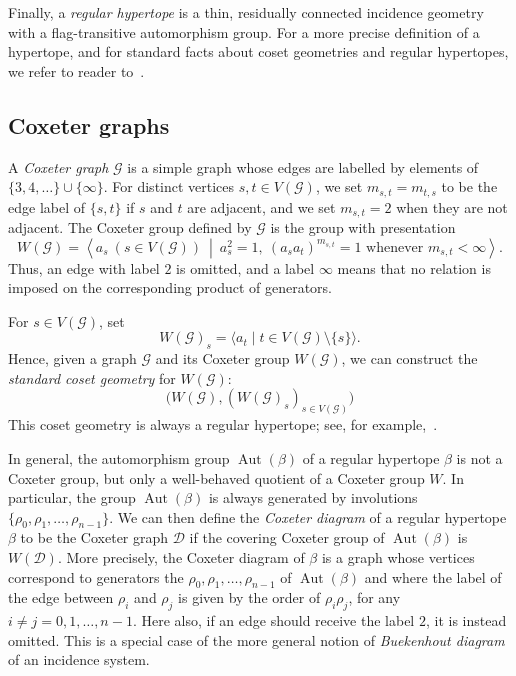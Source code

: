 \documentclass[11pt,letterpaper]{amsart}
\DeclareMathOperator{\Aut}{Aut}
\newcommand{\GG}{\mathcal{G}}
\begin{document}
Finally, a \emph{regular hypertope} is a thin, residually connected incidence geometry with a flag-transitive automorphism group. For a more precise definition of a hypertope, and for standard facts about coset geometries and regular hypertopes, we refer to reader to~\cite{buekenhout2013diagram,PiedadeTranchida_FromGroupOps2026,hypertopes}.

\subsection{Coxeter graphs}\label{sec:prelims:Coxeter}

A \emph{Coxeter graph} $\GG$ is a simple graph whose edges are labelled by elements of $\{3,4,\ldots\}\cup\{\infty\}$. For distinct vertices $s,t\in V(\GG)$, we set $m_{s,t}=m_{t,s}$ to be the edge label of $\{s,t\}$ if $s$ and $t$ are adjacent, and we set $m_{s,t}=2$ when they are not adjacent. The Coxeter group defined by $\GG$ is the group with presentation
\[
W(\GG)=\left\langle a_s\ (s\in V(\GG))\ \middle|\
 a_s^2=1,\ (a_sa_t)^{m_{s,t}}=1\text{ whenever }m_{s,t}<\infty
\right\rangle.
\]
Thus, an edge with label $2$ is omitted, and a label $\infty$ means that no relation is imposed on the corresponding product of generators.

For $s\in V(\GG)$, set
\[
W(\GG)_s=\langle a_t\mid t\in V(\GG)\setminus\{s\}\rangle.
\]
Hence, given a graph $\GG$ and its Coxeter group $W(\GG)$, we can construct the \emph{standard coset geometry} for $W(\GG)$:
\[
\bigl(W(\GG),(W(\GG)_s)_{s\in V(\GG)}\bigr)
\]
This coset geometry is always a regular hypertope; see, for example,~\cite{buekenhout2013diagram,ARP,Bourbaki2006}.

In general, the automorphism group $\Aut(\beta)$ of a regular hypertope $\beta$ is not a Coxeter group, but only a well-behaved quotient of a Coxeter group $W$. In particular, the group $\Aut(\beta)$ is always generated by involutions $\{\rho_0,\rho_1,\ldots,\rho_{n-1}\}$. We can then define the \textit{Coxeter diagram} of a regular hypertope $\beta$ to be the Coxeter graph $\mathcal{D}$ if the covering Coxeter group of $\Aut(\beta)$ is $W(\mathcal{D})$. More precisely, the Coxeter diagram of $\beta$ is a graph whose vertices correspond to generators the $\rho_0, \rho_1, \ldots, \rho_{n-1}$ of $\Aut(\beta)$ and where the label of the edge between $\rho_i$ and $\rho_j$ is given by the order of $\rho_i\rho_j$, for any $i \neq j =0,1,\ldots,n-1$. Here also, if an edge should receive the label $2$, it is instead omitted. This is a special case of the more general notion of \textit{Buekenhout diagram} of an incidence system.
\end{document}
